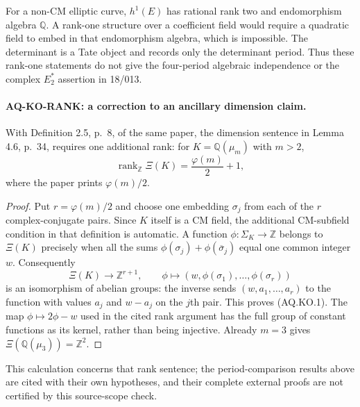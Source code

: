 For a non-CM elliptic curve, $h^1(E)$ has rational rank two
and endomorphism algebra $\mathbb Q$.  A rank-one structure
over a coefficient field would require a quadratic field to
embed in that endomorphism algebra, which is impossible.
The determinant is a Tate object and records only the
determinant period.  Thus these rank-one statements do not
give the four-period algebraic independence or the
complex $E_2^*$ assertion in 18/013.

\paragraph{AQ-KO-RANK: a correction to an ancillary dimension claim.}
With Definition 2.5, p.~8, of the same paper, the dimension
sentence in Lemma 4.6, p.~34, requires one additional rank:
for $K=\mathbb Q(\mu_m)$ with $m>2$,
\[
 \operatorname{rank}_{\mathbb Z}\Xi(K)
       =\frac{\varphi(m)}2+1,
 \tag{AQ.KO.1}
\]
where the paper prints $\varphi(m)/2$.
\begin{proof}
Put $r=\varphi(m)/2$ and choose one embedding
$\sigma_j$ from each of the $r$ complex-conjugate pairs.
Since $K$ itself is a CM field, the additional CM-subfield
condition in that definition is automatic.
A function $\phi:\Sigma_K\to\mathbb Z$ belongs to
$\Xi(K)$ precisely when all the sums
$\phi(\sigma_j)+\phi(\overline\sigma_j)$ equal
one common integer $w$.
Consequently
\[
 \Xi(K)\longrightarrow\mathbb Z^{r+1},\qquad
 \phi\longmapsto(w,\phi(\sigma_1),\ldots,\phi(\sigma_r))
\]
is an isomorphism of abelian groups: the inverse sends
$(w,a_1,\ldots,a_r)$ to the function with values
$a_j$ and $w-a_j$ on the $j$th pair.
This proves (AQ.KO.1).  The map
$\phi\mapsto2\phi-w$ used in the cited rank argument
has the full group of constant functions as its kernel,
rather than being injective.  Already $m=3$ gives
$\Xi(\mathbb Q(\mu_3))=\mathbb Z^2$.
\end{proof}
This calculation concerns that rank sentence; the
period-comparison results above are cited with their
own hypotheses, and their complete external proofs
are not certified by this source-scope check.

